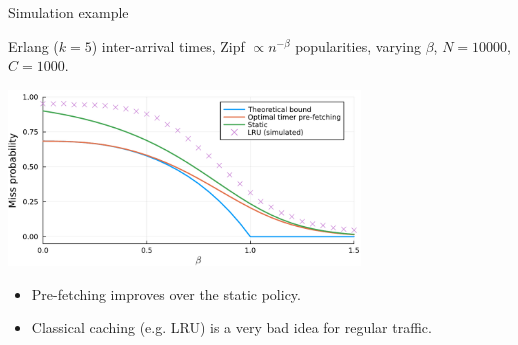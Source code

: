 \documentclass[aspectratio=169]{beamer}
\begin{document}
\begin{frame}{Simulation example}
	
	Erlang ($k=5$) inter-arrival times, Zipf $\propto n^{-\beta}$ popularities, varying $\beta$, $N=10000$, $C=1000$.

\begin{center}
\includegraphics[width=0.7\textwidth]{figuras/comparison.pdf}
\end{center}

\vfill
\begin{itemize}
\item Pre-fetching improves over the static policy.
\item Classical caching (e.g. LRU) is a very bad idea for regular traffic.
\end{itemize}
\end{frame}
\end{document}
